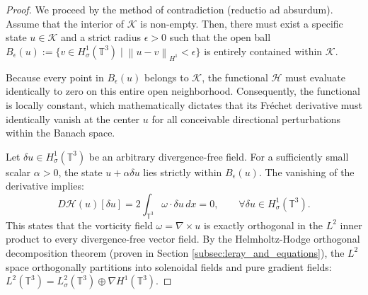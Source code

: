 \documentclass[12pt,a4paper]{article}
\theoremstyle{plain}
\theoremstyle{definition}
\theoremstyle{remark}
\newcommand{\T}{\mathbb{T}}
\newcommand{\norm}[1]{\left\|#1\right\|}
\begin{document}
\begin{proof}
We proceed by the method of contradiction (reductio ad absurdum). Assume that the interior of $\mathcal{K}$ is non-empty. Then, there must exist a specific state $u \in \mathcal{K}$ and a strict radius $\epsilon > 0$ such that the open ball $B_\epsilon(u) := \{ v \in H^1_\sigma(\T^3) \mid \norm{u - v}_{H^1} < \epsilon \}$ is entirely contained within $\mathcal{K}$.

Because every point in $B_\epsilon(u)$ belongs to $\mathcal{K}$, the functional $\mathcal{H}$ must evaluate identically to zero on this entire open neighborhood. Consequently, the functional is locally constant, which mathematically dictates that its Fréchet derivative must identically vanish at the center $u$ for all conceivable directional perturbations within the Banach space. 

Let $\delta u \in H^1_\sigma(\T^3)$ be an arbitrary divergence-free field. For a sufficiently small scalar $\alpha > 0$, the state $u + \alpha \delta u$ lies strictly within $B_\epsilon(u)$. The vanishing of the derivative implies:
\[
  D\mathcal{H}(u)[\delta u] = 2 \int_{\T^3} \omega \cdot \delta u \,dx = 0, \qquad \forall \delta u \in H^1_\sigma(\T^3).
\]
This states that the vorticity field $\omega = \nabla \times u$ is exactly orthogonal in the $L^2$ inner product to every divergence-free vector field. By the Helmholtz-Hodge orthogonal decomposition theorem (proven in Section \ref{subsec:leray_and_equations}), the $L^2$ space orthogonally partitions into solenoidal fields and pure gradient fields: $L^2(\T^3) = L^2_\sigma(\T^3) \oplus \nabla H^1(\T^3)$. 


\end{proof}
\end{document}
